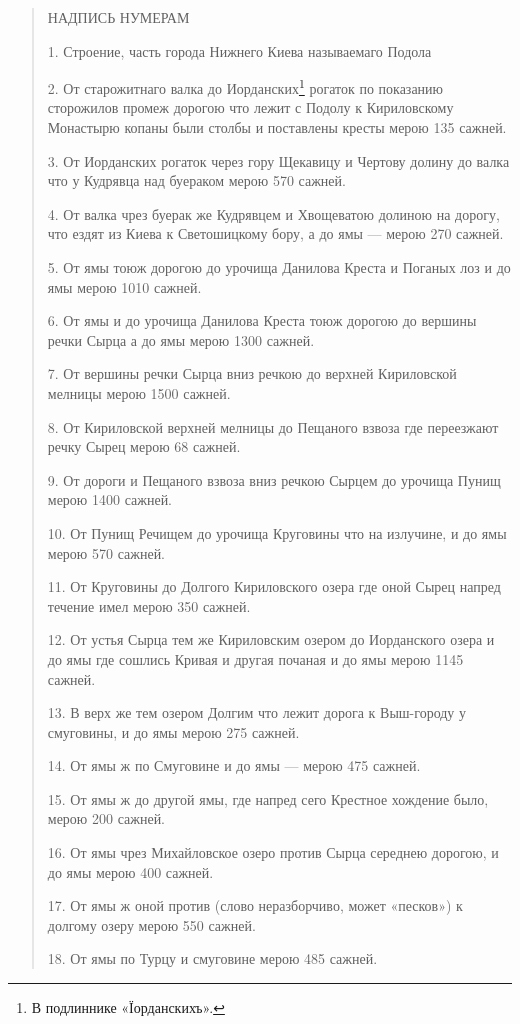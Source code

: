 \begin{quotation}
НАДПИСЬ НУМЕРАМ

1. Строение, часть города Нижнего Киева называемаго Подола

2. От старожитнаго валка до Иорданских\footnote{В подлиннике «Їорданскихъ».} рогаток по показанию сторожилов промеж дорогою что лежит с Подолу к Кириловскому Монастырю копаны были столбы и поставлены кресты мерою 135 сажней.

3. От Иорданских рогаток через гору Щекавицу и Чертову долину до валка что у Кудрявца над буераком мерою 570 сажней.

4. От валка чрез буерак же Кудрявцем и Хвощеватою долиною на дорогу, что ездят из Киева к Светошицкому бору, а до ямы --- мерою 270 сажней.

5. От ямы тоюж дорогою до урочища Данилова Креста и Поганых лоз и до ямы мерою 1010 сажней.

6. От ямы и до урочища Данилова Креста тоюж дорогою до вершины речки Сырца а до ямы мерою 1300 сажней.

7. От вершины речки Сырца вниз речкою до верхней Кириловской мелницы мерою 1500 сажней.

8. От Кириловской верхней мелницы до Пещаного взвоза где переезжают речку Сырец мерою 68 сажней.

9. От дороги и Пещаного взвоза вниз речкою Сырцем до урочища Пунищ мерою 1400 сажней.

10. От Пунищ Речищем до урочища Круговины что на излучине, и до ямы мерою 570 сажней.

11. От Круговины до Долгого Кириловского озера где оной Сырец напред течение имел мерою 350 сажней.

12. От устья Сырца тем же Кириловским озером до Иорданского озера и до ямы где сошлись Кривая и другая почаная и до ямы мерою 1145 сажней.

13. В верх же тем озером Долгим что лежит дорога к Выш-городу у смуговины, и до ямы мерою 275 сажней.

14. От ямы ж по Смуговине и до ямы --- мерою 475 сажней.

15. От ямы ж до другой ямы, где напред сего Крестное хождение было, мерою 200 сажней.

16. От ямы чрез Михайловское озеро против Сырца середнею дорогою, и до ямы мерою 400 сажней.

17. От ямы ж оной против (слово неразборчиво, может «песков») к долгому озеру мерою 550 сажней.

18. От ямы по Турцу и смуговине мерою 485 сажней.


\end{quotation}
